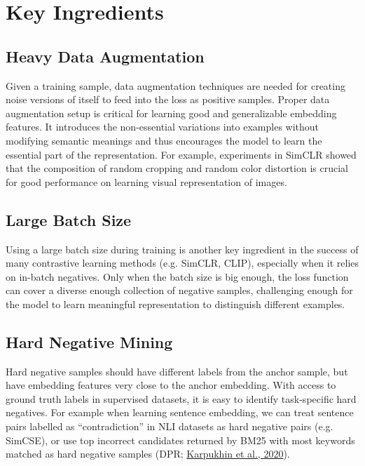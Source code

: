 \documentclass[12pt]{article}
\begin{document}
\section{Key Ingredients}

\subsection{Heavy Data Augmentation}

Given a training sample, data augmentation techniques are needed for creating noise versions of itself to feed into the loss as positive samples. Proper data augmentation setup is critical for learning good and generalizable embedding features. It introduces the non-essential variations into examples without modifying semantic meanings and thus encourages the model to learn the essential part of the representation. For example, experiments in SimCLR showed that the composition of random cropping and random color distortion is crucial for good performance on learning visual representation of images.

\subsection{Large Batch Size}

Using a large batch size during training is another key ingredient in the success of many contrastive learning methods (e.g. SimCLR, CLIP), especially when it relies on in-batch negatives. Only when the batch size is big enough, the loss function can cover a diverse enough collection of negative samples, challenging enough for the model to learn meaningful representation to distinguish different examples.

\subsection{Hard Negative Mining}

Hard negative samples should have different labels from the anchor sample, but have embedding features very close to the anchor embedding. With access to ground truth labels in supervised datasets, it is easy to identify task-specific hard negatives. For example when learning sentence embedding, we can treat sentence pairs labelled as ``contradiction'' in NLI datasets as hard negative pairs (e.g. SimCSE), or use top incorrect candidates returned by BM25 with most keywords matched as hard negative samples (DPR; \href{https://arxiv.org/abs/2004.04906}{Karpukhin et al., 2020}).
\end{document}
